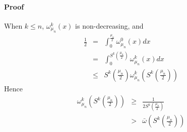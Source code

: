 \documentclass{article}
\begin{document}
\paragraph{Proof}
When $k \le n$, $\omega_{\mu_n}^k(x)$ is non-decreasing, and
 \begin{eqnarray}
     \frac{1}{2}  & = & \int_0^{\frac{\mu_n}{2}} \omega_{\mu_n}^0(x) dx \nonumber\\
                  & = &\int_0^{S^k \left(\frac{\mu_n}{2}\right)} \omega_{\mu_n}^k(x) dx \nonumber \\
                  &\le& S^k \left(\frac{\mu_n}{2}\right) \omega_{\mu_n}^k(S^k \left(\frac{\mu_n}{2}\right))
 \end{eqnarray} 
Hence
\begin{eqnarray}
\omega_{\mu_n}^k \left(S^k \left(\frac{\mu_n}{2}\right)\right) 
                  &\ge&  \frac{1}{2 S^k \left( \frac{\mu_n}{2}\right)} \nonumber\\
                  &>&  \bar{\omega} \left(S^k \left(\frac{\mu_n}{2}\right)\right) 
\end{eqnarray}



\cite{Wiggins2004}
\cite{Ottino2004}
\cite{Mezic2005}
\cite{Thiffeault2003-13}
\cite{Thiffeault2003-309}
\cite{Thiffeault2004}
\cite{Thiffeault2005}
\cite{Ashwin2002}
\cite{Boyd2004}
\cite{Diaconis1996}
\cite{Diaconis2001}
\cite{Diaconis2005}
\cite{Diaconis1986}
\cite{Hammarstr2005}
\cite{Fereday2002}
\cite{Tsang2005}
\cite{Haynes2005}
\cite{Pierrehumbert2000}
\cite{Percival1989}





\end{document}
